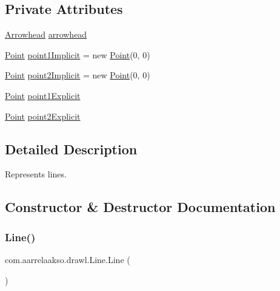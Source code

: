 \subsection*{Private Attributes}
\begin{DoxyCompactItemize}
\item 
\hyperlink{classcom_1_1aarrelaakso_1_1drawl_1_1_arrowhead}{Arrowhead} \hyperlink{classcom_1_1aarrelaakso_1_1drawl_1_1_line_a6a82ee992a758049f71dfbb22c597149}{arrowhead}
\item 
\hyperlink{classcom_1_1aarrelaakso_1_1drawl_1_1_point}{Point} \hyperlink{classcom_1_1aarrelaakso_1_1drawl_1_1_line_a48220286707ae05387f9c99d9e08784c}{point1\+Implicit} = new \hyperlink{classcom_1_1aarrelaakso_1_1drawl_1_1_point}{Point}(0, 0)
\item 
\hyperlink{classcom_1_1aarrelaakso_1_1drawl_1_1_point}{Point} \hyperlink{classcom_1_1aarrelaakso_1_1drawl_1_1_line_a055d1e743c66cc808f108664b38d7de2}{point2\+Implicit} = new \hyperlink{classcom_1_1aarrelaakso_1_1drawl_1_1_point}{Point}(0, 0)
\item 
\hyperlink{classcom_1_1aarrelaakso_1_1drawl_1_1_point}{Point} \hyperlink{classcom_1_1aarrelaakso_1_1drawl_1_1_line_a346544836f1f00ee8b9601a8cf036b36}{point1\+Explicit}
\item 
\hyperlink{classcom_1_1aarrelaakso_1_1drawl_1_1_point}{Point} \hyperlink{classcom_1_1aarrelaakso_1_1drawl_1_1_line_a6dac91f727b34d1d798892ed6b6c2475}{point2\+Explicit}
\end{DoxyCompactItemize}


\subsection{Detailed Description}
Represents lines. 

\subsection{Constructor \& Destructor Documentation}
\mbox{\label{classcom_1_1aarrelaakso_1_1drawl_1_1_line_af96a733c80d52bf419cab52fb09bc514}} 
\subsubsection{\texorpdfstring{Line()}{Line()}\hspace{0.1cm}{\footnotesize\ttfamily [1/2]}}
{\footnotesize\ttfamily com.\+aarrelaakso.\+drawl.\+Line.\+Line (\begin{DoxyParamCaption}{ }\end{DoxyParamCaption})}



